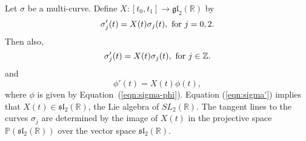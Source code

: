 \documentclass[11pt]{amsart}
\newcommand{\ring}[1]{\mathbb{#1}}
\def\rZ{{\ring{Z}}}
\def\rR{{\ring{R}}}
\def\rP{{\ring{P}}}
\begin{document}


Let $\sigma$ be a multi-curve.  Define $X:[t_0,t_1]\to\mathfrak{gl}_2(\rR)$
by
$$\sigma'_j(t) = X(t)\sigma_j(t),\hbox{ for } j = 0,2.$$
Then also,
$$
\sigma'_j(t) = X(t)\sigma_j(t),\hbox{ for } j\in\rZ.
$$
and
\begin{equation}\label{eqn:Xt}
\phi'(t) = X(t) \phi(t),
\end{equation}
where $\phi$ is given by Equation~(\ref{eqn:sigma-phi}).
Equation (\ref{eqn:sigma'}) implies that $X(t)\in\mathfrak{sl}_2(\rR)$,
the Lie algebra of $SL_2(\rR)$.  The tangent lines to the curves
$\sigma_j$ are determined by the image of $X(t)$ in the projective
space $\rP(\mathfrak{sl}_2(\rR))$ over the vector space $\mathfrak{sl}_2(\rR)$.
\end{document}
